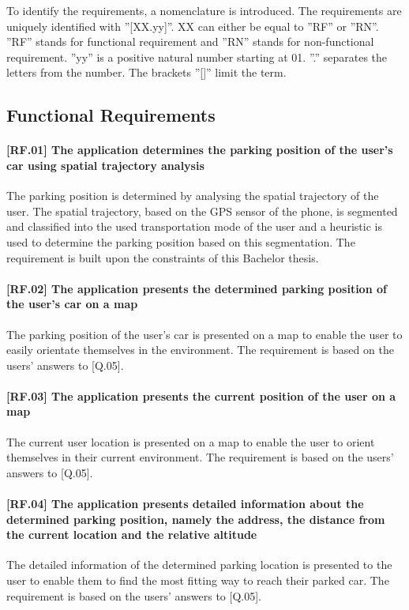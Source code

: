 To identify the requirements, a nomenclature is introduced. The requirements are uniquely identified with ''[XX.yy]''. XX can either be equal to ''RF'' or ''RN''. ''RF'' stands for functional requirement and ''RN'' stands for non-functional requirement. ''yy'' is a positive natural number starting at 01. ''.'' separates the letters from the number. The brackets ''[]'' limit the term.  

\subsection{Functional Requirements}

\paragraph{[RF.01] The application determines the parking position of the user's car using spatial trajectory analysis}
The parking position is determined by analysing the spatial trajectory of the user. The spatial trajectory, based on the GPS sensor of the phone, is segmented and classified into the used transportation mode of the user and a heuristic is used to determine the parking position based on this segmentation. The requirement is built upon the constraints of this Bachelor thesis. 

\paragraph{[RF.02] The application presents the determined parking position of the user's car on a map}
The parking position of the user's car is presented on a map to enable the user to easily orientate themselves in the environment. The requirement is based on the users' answers to [Q.05].

\paragraph{[RF.03] The application presents the current position of the user on a map}
The current user location is presented on a map to enable the user to orient themselves in their current environment. The requirement is based on the users' answers to [Q.05].

\paragraph{[RF.04] The application presents detailed information about the determined parking position, namely the address, the distance from the current location and the relative altitude}
The detailed information of the determined parking location is presented to the user to enable them to find the most fitting way to reach their parked car. The requirement is based on the users' answers to [Q.05].

